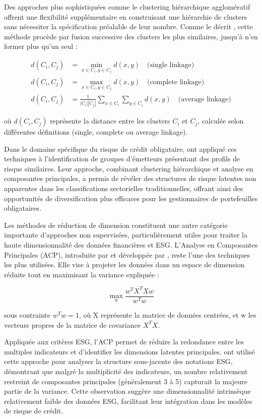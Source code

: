 Des approches plus sophistiquées comme le clustering hiérarchique agglomératif offrent une flexibilité supplémentaire en construisant une hiérarchie de clusters sans nécessiter la spécification préalable de leur nombre. Comme le décrit \citet{aggarwal2014}, cette méthode procède par fusion successive des clusters les plus similaires, jusqu'à n'en former plus qu'un seul :

\begin{align}
d(C_i, C_j) &= \min_{x \in C_i, y \in C_j} d(x, y) \quad \text{(single linkage)}\\
d(C_i, C_j) &= \max_{x \in C_i, y \in C_j} d(x, y) \quad \text{(complete linkage)}\\
d(C_i, C_j) &= \frac{1}{|C_i||C_j|} \sum_{x \in C_i} \sum_{y \in C_j} d(x, y) \quad \text{(average linkage)}
\end{align}

où $d(C_i, C_j)$ représente la distance entre les clusters $C_i$ et $C_j$, calculée selon différentes définitions (single, complete ou average linkage).

Dans le domaine spécifique du risque de crédit obligataire, \citet{poon2019} ont appliqué ces techniques à l'identification de groupes d'émetteurs présentant des profils de risque similaires. Leur approche, combinant clustering hiérarchique et analyse en composantes principales, a permis de révéler des structures de risque latentes non apparentes dans les classifications sectorielles traditionnelles, offrant ainsi des opportunités de diversification plus efficaces pour les gestionnaires de portefeuilles obligataires.

Les méthodes de réduction de dimension constituent une autre catégorie importante d'approches non supervisées, particulièrement utiles pour traiter la haute dimensionnalité des données financières et ESG. L'Analyse en Composantes Principales (ACP), introduite par \citet{pearson1901} et développée par \citet{hotelling1933}, reste l'une des techniques les plus utilisées. Elle vise à projeter les données dans un espace de dimension réduite tout en maximisant la variance expliquée :

\begin{equation}
\max_{w} \frac{w^T X^T X w}{w^T w}
\end{equation}

sous contrainte $w^T w = 1$, où X représente la matrice de données centrées, et w les vecteurs propres de la matrice de covariance $X^T X$.

Appliquée aux critères ESG, l'ACP permet de réduire la redondance entre les multiples indicateurs et d'identifier les dimensions latentes principales. \citet{dorfleitner2018} ont utilisé cette approche pour analyser la structure sous-jacente des notations ESG, démontrant que malgré la multiplicité des indicateurs, un nombre relativement restreint de composantes principales (généralement 3 à 5) capturait la majeure partie de la variance. Cette observation suggère une dimensionnalité intrinsèque relativement faible des données ESG, facilitant leur intégration dans les modèles de risque de crédit.

